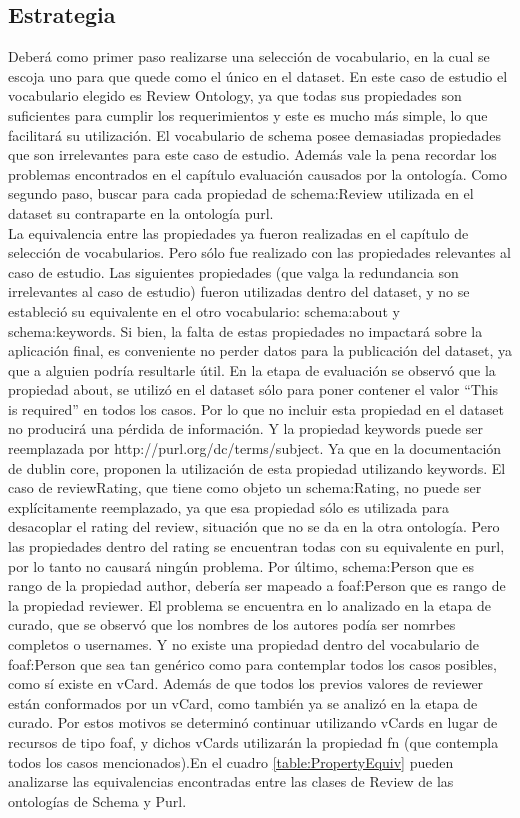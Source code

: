 \subsection*{Estrategia} Deberá como primer paso realizarse una selección de vocabulario, en la cual se escoja uno para que quede como el único en el dataset.
En este caso de estudio el vocabulario elegido es Review Ontology, ya que todas sus propiedades son suficientes para cumplir los requerimientos y 
este es mucho más simple, lo que facilitará su utilización. El vocabulario de schema posee demasiadas propiedades que son irrelevantes para este caso de estudio. 
Además vale la pena recordar los problemas encontrados en el capítulo evaluación causados por la ontología.
Como segundo paso, buscar para cada propiedad de schema:Review utilizada en el dataset su contraparte en la ontología purl.\\
La equivalencia entre las propiedades ya fueron realizadas en el capítulo de selección de vocabularios. Pero sólo fue realizado con las propiedades 
relevantes al caso de estudio. Las siguientes propiedades (que valga la redundancia son irrelevantes al caso de estudio) fueron utilizadas dentro del dataset, y 
no se estableció su equivalente en el otro vocabulario:
schema:about y schema:keywords. 
Si bien, la falta de estas propiedades no impactará sobre la aplicación final, es conveniente no perder datos para la publicación del dataset, ya que 
a alguien podría resultarle útil. 
En la etapa de evaluación se observó que la propiedad about, se utilizó en el dataset sólo para poner contener el valor ``This is required'' en todos los casos. 
Por lo que no incluir esta propiedad en el dataset no producirá una pérdida de información.
Y la propiedad keywords puede ser reemplazada por http://purl.org/dc/terms/subject. Ya que en la documentación de dublin core, proponen la utilización de esta propiedad 
utilizando keywords.
El caso de reviewRating, que tiene como objeto un schema:Rating, no puede ser explícitamente reemplazado, ya que esa propiedad 
sólo es utilizada para desacoplar el rating del review, situación que no se da en la otra ontología. Pero las propiedades dentro del rating se encuentran todas 
con su equivalente en purl, por lo tanto no causará ningún problema.
Por último, schema:Person que es rango de la propiedad author, debería ser mapeado a foaf:Person que es rango de la propiedad reviewer. 
El problema se encuentra en lo analizado en la etapa de curado, que se observó que los nombres de los autores podía ser nomrbes completos o usernames. 
Y no existe una propiedad dentro del vocabulario de foaf:Person que sea tan genérico como para contemplar todos los casos posibles, como sí existe en vCard.
Además de que todos los previos valores de reviewer están conformados por un vCard, como también ya se analizó en la etapa de curado.
Por estos motivos se determinó continuar utilizando vCards en lugar de recursos de tipo foaf, y dichos vCards utilizarán la propiedad
fn (que contempla todos los casos mencionados).En el cuadro \ref{table:PropertyEquiv} pueden analizarse las equivalencias encontradas entre 
las clases de Review de las ontologías de Schema y Purl.


